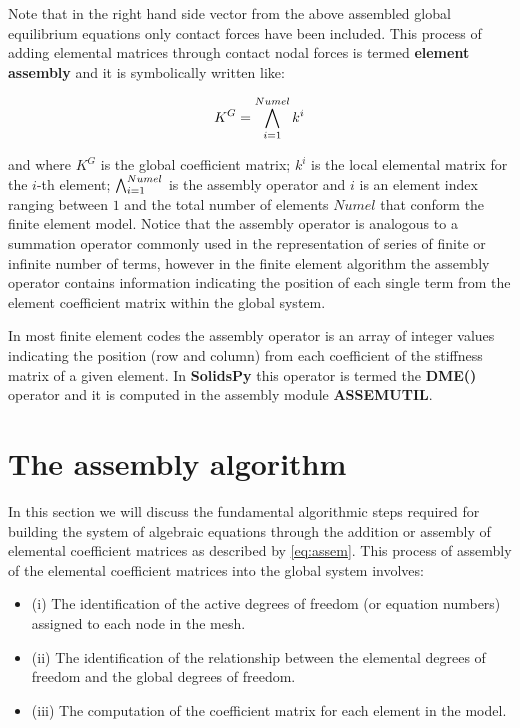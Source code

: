 Note that in the right hand side vector from the above assembled global equilibrium equations only contact forces have been included. This process of adding elemental matrices through contact nodal forces is termed {\bf element assembly} and it is symbolically written like:

\begin{equation}\label{eq:assem}
{K^G}=\operatorname*{\bigwedge}_{i=1}^{Numel} k^i
\end{equation}

and where $K^G$ is the global coefficient matrix; $k^i$ is the local elemental matrix for the $i$-th element; $\operatorname*{\bigwedge}_{i=1}^{Numel}$ is the assembly operator and $i$ is an element index ranging between $1$ and the total number of elements $Numel$ that conform the finite element model. Notice that the assembly operator is analogous to a summation operator commonly used in the representation of series of finite or infinite number of terms, however in the finite element algorithm the assembly operator contains information indicating the position of each single term from the element coefficient matrix within the global system.

\begin{tcolorbox}

In most finite element codes the assembly operator is an array of integer values indicating the position (row and column) from each coefficient of the stiffness matrix of a given element. In {\bf SolidsPy} this operator is termed the {\bf DME()} operator and it is computed in the assembly module {\bf ASSEMUTIL}.

\end{tcolorbox}


\section{The assembly algorithm}

In this section we will discuss the fundamental algorithmic steps required for building the system of algebraic equations through the addition or assembly of elemental coefficient matrices as described by \cref{eq:assem}. This process of assembly of the elemental coefficient matrices into the global system involves:

\begin{itemize}
\item (i) The identification of the active degrees of freedom (or equation numbers) assigned to each node in the mesh.
\item (ii) The identification of the relationship between the elemental degrees of freedom and the global degrees of freedom.
\item (iii) The computation of the coefficient matrix for each element in the model.
\end{itemize}

